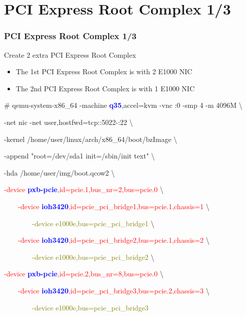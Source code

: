 \documentclass[aspectratio=169]{beamer}
\begin{document}
\section{PCI Express Root Complex 1/3}
\begin{frame}
\frametitle{PCI Express Root Complex 1/3}
{\LARGE Create 2 extra PCI Express Root Complex}
\begin{itemize}
\item The 1st PCI Express Root Complex is with 2 E1000 NIC
\item The 2nd PCI Express Root Complex is with 1 E1000 NIC
\end{itemize}
\begin{block}{}
\small
\# qemu-system-x86\_64 -machine \textbf{\textcolor{blue}{q35}},accel=kvm -vnc :0 -smp 4 -m 4096M \textbackslash

-net nic -net user,hostfwd=tcp::5022-:22 \textbackslash

-kernel /home/user/linux/arch/x86\_64/boot/bzImage \textbackslash
	
-append "root=/dev/sda1 init=/sbin/init text" \textbackslash

-hda /home/user/img/boot.qcow2 \textbackslash

\textcolor{red}{-device \textbf{\textcolor{blue}{pxb-pcie}},id=pcie.1,bus\_nr=2,bus=pcie.0} \textbackslash

\textcolor{red}{\ \ \ \ -device \textbf{\textcolor{blue}{ioh3420}},id=pcie\_pci\_bridge1,bus=pcie.1,chassis=1} \textbackslash

\textcolor{olive}{\ \ \ \ \ \ \ \ -device e1000e,bus=pcie\_pci\_bridge1} \textbackslash

\textcolor{red}{\ \ \ \ -device \textbf{\textcolor{blue}{ioh3420}},id=pcie\_pci\_bridge2,bus=pcie.1,chassis=2} \textbackslash

\textcolor{olive}{\ \ \ \ \ \ \ \ -device e1000e,bus=pcie\_pci\_bridge2} \textbackslash

\textcolor{red}{-device \textbf{\textcolor{blue}{pxb-pcie}},id=pcie.2,bus\_nr=8,bus=pcie.0} \textbackslash

\textcolor{red}{\ \ \ \ -device \textbf{\textcolor{blue}{ioh3420}},id=pcie\_pci\_bridge3,bus=pcie.2,chassis=3} \textbackslash

\textcolor{olive}{\ \ \ \ \ \ \ \ -device e1000e,bus=pcie\_pci\_bridge3}

\end{block}
\end{frame}

\end{document}
